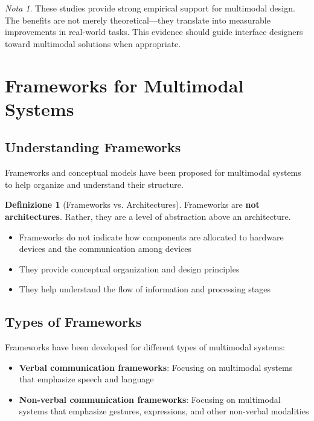 \documentclass[11pt,a4paper]{article}
\theoremstyle{definition}
\newtheorem{definition}{Definizione}[section]
\theoremstyle{plain}
\theoremstyle{remark}
\newtheorem*{remark}{Nota}
\begin{document}
\begin{remark}
These studies provide strong empirical support for multimodal design. The benefits are not merely theoretical—they translate into measurable improvements in real-world tasks. This evidence should guide interface designers toward multimodal solutions when appropriate.
\end{remark}

\section{Frameworks for Multimodal Systems}

\subsection{Understanding Frameworks}

Frameworks and conceptual models have been proposed for multimodal systems to help organize and understand their structure.

\begin{definition}[Frameworks vs. Architectures]
Frameworks are \textbf{not architectures}. Rather, they are a level of abstraction above an architecture.
\begin{itemize}
    \item Frameworks do not indicate how components are allocated to hardware devices and the communication among devices
    \item They provide conceptual organization and design principles
    \item They help understand the flow of information and processing stages
\end{itemize}
\end{definition}

\subsection{Types of Frameworks}

Frameworks have been developed for different types of multimodal systems:

\begin{itemize}
    \item \textbf{Verbal communication frameworks}: Focusing on multimodal systems that emphasize speech and language
    \item \textbf{Non-verbal communication frameworks}: Focusing on multimodal systems that emphasize gestures, expressions, and other non-verbal modalities
\end{itemize}
\end{document}
